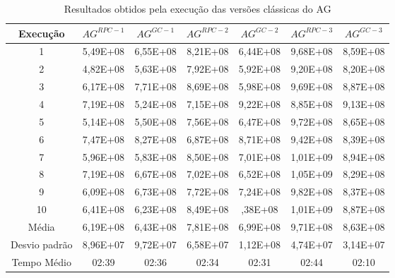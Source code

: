 \begin{table}[H]
\centering
\caption{Resultados obtidos pela execução das versões clássicas do AG}
\label{tab:results1_1}
\begin{tabular}{|c|c|c|c|c|c|c|}
\hline
Execução & $AG^{RPC-1}$ & $AG^{GC-1}$ & $AG^{RPC-2}$ & $AG^{GC-2}$ & $AG^{RPC-3}$ & $AG^{GC-3}$ \\ \hline
1 & 5,49E+08 & 6,55E+08 & 8,21E+08 & 6,44E+08 & 9,68E+08 & 8,59E+08 \\ \hline
2 & 4,82E+08 & 5,63E+08 & 7,92E+08 & 5,92E+08 & 9,20E+08 & 8,20E+08 \\ \hline
3 & 6,17E+08 & 7,71E+08 & 8,69E+08 & 5,98E+08 & 9,69E+08 & 8,87E+08 \\ \hline
4 & 7,19E+08 & 5,24E+08	& 7,15E+08 & 9,22E+08 & 8,85E+08 & 9,13E+08 \\ \hline
5 & 5,14E+08 & 5,50E+08 & 7,56E+08 & 6,47E+08 & 9,72E+08 & 8,65E+08 \\ \hline
6 & 7,47E+08 & 8,27E+08 & 6,87E+08 & 8,71E+08 & 9,42E+08 & 8,39E+08 \\ \hline
7 & 5,96E+08 & 5,83E+08 & 8,50E+08 & 7,01E+08 & 1,01E+09 & 8,94E+08 \\ \hline
8 & 7,19E+08 & 6,67E+08 & 7,02E+08 & 6,52E+08 & 1,05E+09 & 8,29E+08 \\ \hline
9 & 6,09E+08 & 6,73E+08 & 7,72E+08 & 7,24E+08 & 9,82E+08 & 8,37E+08 \\ \hline
10 & 6,41E+08 & 6,23E+08 & 8,49E+08 & ,38E+08 & 1,01E+09 & 8,87E+08 \\ \hline

Média & 6,19E+08 & 6,43E+08 & 7,81E+08 & 6,99E+08 & 9,71E+08 & 8,63E+08 \\ \hline
Desvio padrão & 8,96E+07 & 9,72E+07 & 6,58E+07 & 1,12E+08 & 4,74E+07 & 3,14E+07 \\ \hline
Tempo Médio & 02:39 & 02:36 & 02:34 & 02:31 & 02:44 & 02:10 \\ \hline
\end{tabular}
\end{table}

